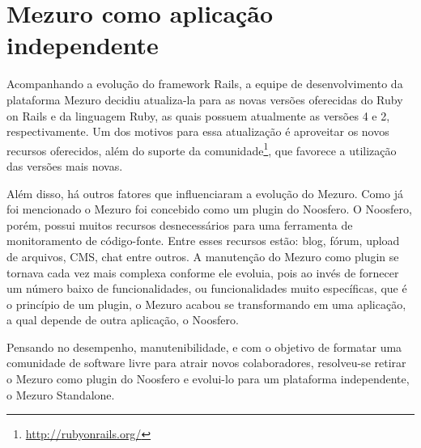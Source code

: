 \section{Mezuro como aplicação independente}



Acompanhando a evolução do framework Rails, a equipe de desenvolvimento da plataforma Mezuro decidiu atualiza-la para as novas versões oferecidas do Ruby on Rails e da linguagem Ruby, as quais possuem atualmente as versões 4 e 2, respectivamente. Um dos motivos para essa atualização é aproveitar os novos recursos oferecidos, além do suporte da comunidade\footnote{\url{http://rubyonrails.org/}}, que favorece a utilização das versões mais novas.

Além disso, há outros fatores que influenciaram a evolução do Mezuro. Como já foi mencionado o Mezuro foi concebido como um plugin do Noosfero. O Noosfero, porém, possui muitos recursos desnecessários para uma ferramenta de monitoramento de código-fonte. Entre esses recursos estão: blog, fórum, upload de arquivos, CMS, chat entre outros. A manutenção do Mezuro como plugin se tornava cada vez mais complexa conforme ele evoluia, pois ao invés de fornecer um número baixo de funcionalidades, ou funcionalidades muito específicas, que é o princípio de um plugin, o Mezuro acabou se transformando em uma aplicação, a qual depende de outra aplicação, o Noosfero. 

Pensando no desempenho, manutenibilidade, e com o objetivo de formatar uma comunidade de software livre para atrair novos colaboradores, resolveu-se retirar o Mezuro como plugin do Noosfero e evolui-lo para um plataforma independente, o Mezuro Standalone.
  


